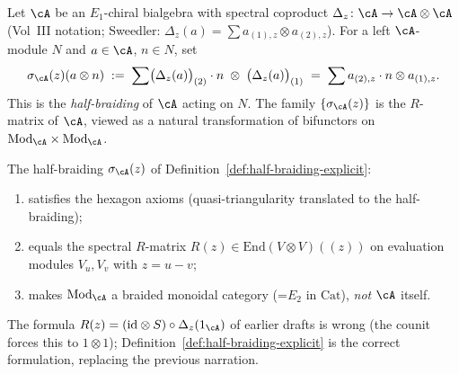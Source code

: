 \begin{definition}%
\label{def:half-braiding-explicit}%
%
%
Let $\cA$ be an $E_1$-chiral bialgebra with spectral coproduct
$\Delta_z\colon\cA\to\cA\otimes\cA$
(Vol~III notation; Sweedler: $\Delta_z(a)=\sum a_{(1),z}\otimes a_{(2),z}$).
For a left $\cA$-module $N$ and $a\in\cA$, $n\in N$, set
\[
\sigma_\cA(z)(a\otimes n)
\;:=\;
\sum\bigl(\Delta_z(a)\bigr)_{(2)}\cdot n\;\otimes\;\bigl(\Delta_z(a)\bigr)_{(1)}
\;=\;\sum a_{(2),z}\cdot n\otimes a_{(1),z}.
\]
This is the \emph{half-braiding} of $\cA$ acting on $N$. The family
$\{\sigma_\cA(z)\}$ is the $R$-matrix of $\cA$, viewed as a natural
transformation of bifunctors on $\mathrm{Mod}_\cA\times\mathrm{Mod}_\cA$.
\end{definition}

\begin{proposition}%
\label{prop:half-braiding-R-matrix}%
%
%
The half-braiding $\sigma_\cA(z)$ of
Definition~\ref{def:half-braiding-explicit}:
\begin{enumerate}
 \item[\textup{(i)}] satisfies the hexagon axioms (quasi-triangularity
 translated to the half-braiding);
 \item[\textup{(ii)}] equals the spectral $R$-matrix
 $R(z)\in\mathrm{End}(V\otimes V)(\!(z)\!)$ on evaluation modules
 $V_u,V_v$ with $z=u-v$;
 \item[\textup{(iii)}] makes $\mathrm{Mod}_\cA$ a braided monoidal
 category (=$E_2$ in $\mathrm{Cat}$), \emph{not} $\cA$ itself.
\end{enumerate}
The formula $R(z)=(\mathrm{id}\otimes S)\circ\Delta_z(1_\cA)$ of
earlier drafts is wrong (the counit forces this to $1\otimes 1$);
Definition~\ref{def:half-braiding-explicit} is the correct formulation,
replacing the previous narration.
\end{proposition}

